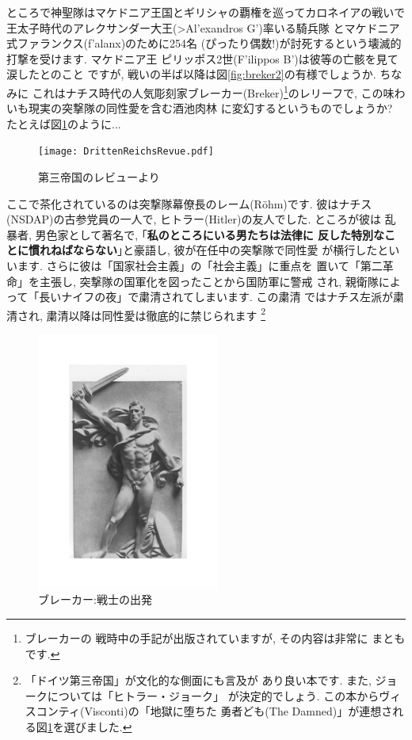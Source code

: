 ところで神聖隊はマケドニア王国とギリシャの覇権を巡ってカロネイアの戦いで
王太子時代のアレクサンダー大王(\textgreek{>Al'exandros G'})率いる騎兵隊
とマケドニア式ファランクス(\textgreek{f'alanx})のために254名
(ぴったり偶数!)が討死するという壊滅的打撃を受けます. マケドニア王
ピリッポス2世(\textgreek{F'ilippos B'})は彼等の亡骸を見て涙したとのこと
ですが, 戦いの半ば以降は図\ref{fig:breker2}の有様でしょうか. ちなみに
これはナチス時代の人気彫刻家ブレーカー(Breker)\footnote{ブレーカーの
戦時中の手記\cite{ブレーカー}が出版されていますが, その内容は非常に
まともです.}のレリーフで, この味わいも現実の突撃隊の同性愛を含む酒池肉林
に変幻するというものでしょうか? たとえば図\ref{fig:rrevue}のように...

\begin{figure}[htbp]
\begin{center}
\texttt{[image: DrittenReichsRevue.pdf]}
\caption{第三帝国のレビューより\cite{関}}
\label{fig:rrevue}
\end{center}
\end{figure}

ここで茶化されているのは突撃隊幕僚長のレーム(R\"ohm)です. 彼はナチス
(NSDAP)の古参党員の一人で, ヒトラー(Hitler)の友人でした. ところが彼は
乱暴者, 男色家として著名で, ｢\textbf{私のところにいる男たちは法律に
反した特別なことに慣れねばならない}｣と豪語し, 彼が在任中の突撃隊で同性愛
が横行したといいます. さらに彼は「国家社会主義」の「社会主義」に重点を
置いて「第二革命」を主張し, 突撃隊の国軍化を図ったことから国防軍に警戒
され, 親衛隊によって「長いナイフの夜」で粛清されてしまいます. この粛清
ではナチス左派が粛清され, 粛清以降は同性愛は徹底的に禁じられます
\footnote{「ドイツ第三帝国」\cite{クラーザー}が文化的な側面にも言及が
あり良い本です. また, ジョークについては「ヒトラー・ジョーク」\cite{関}
が決定的でしょう. この本からヴィスコンティ(Visconti)の「地獄に堕ちた
勇者ども(The Damned)」が連想される図\ref{fig:rrevue}を選びました.}
\newpage

\begin{figure}
\includegraphics[width=6cm]{Breker2_relief.pdf}
\caption{ブレーカー:戦士の出発}
\label{fig:breker1}
\end{figure}

